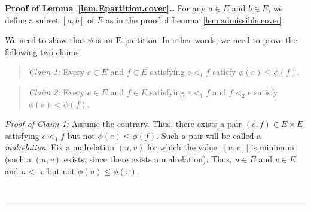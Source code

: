 \documentclass[numbers=enddot,12pt,final,onecolumn,notitlepage,abstracton]{scrartcl}
\theoremstyle{definition}
\newenvironment{statement}{\begin{quote}}{\end{quote}}
\newenvironment{proof}[1][Proof]{\noindent\textbf{#1.} }{\ \rule{0.5em}{0.5em}}
\newcommand{\EE}{{\mathbf{E}}}
\begin{document}
\begin{proof}[Proof of Lemma~\ref{lem.Epartition.cover}.]
For any $a \in E$ and $b \in E$, we define a subset
$\left[a, b\right]$ of $E$ as in the proof of
Lemma~\ref{lem.admissible.cover}.

We need to show that $\phi$ is an $\EE$-partition. In other words,
we need to prove the following two claims:

\begin{statement}
\textit{Claim 1:} Every $e \in E$ and $f \in E$ satisfying
$e <_1 f$ satisfy $\phi\left(e\right) \leq \phi\left(f\right)$.
\end{statement}

\begin{statement}
\textit{Claim 2:} Every $e \in E$ and $f \in E$ satisfying
$e <_1 f$ and $f <_2 e$ satisfy
$\phi\left(e\right) < \phi\left(f\right)$.
\end{statement}

\textit{Proof of Claim 1:} Assume the contrary. Thus, there
exists a pair $\left(e, f\right) \in E \times E$ satisfying
$e <_1 f$ but not $\phi\left(e\right) \leq \phi\left(f\right)$.
Such a pair will be called a \textit{malrelation}. Fix a
malrelation $\left(u, v\right)$ for which the value
$\left|\left[u, v\right]\right|$ is minimum (such a
$\left(u, v\right)$ exists, since there exists a malrelation).
Thus, $u \in E$ and $v \in E$ and $u <_1 v$ but not
$\phi\left(u\right) \leq \phi\left(v\right)$.


\end{proof}
\end{document}
